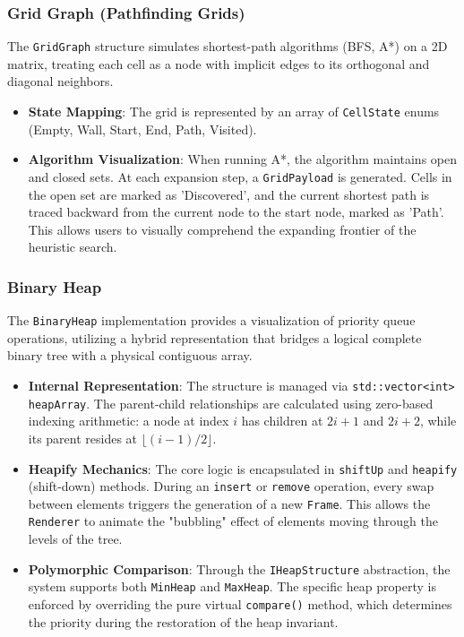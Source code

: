 \subsubsection{Grid Graph (Pathfinding Grids)}
The \texttt{GridGraph} structure simulates shortest-path algorithms (BFS, A*) on a 2D matrix, treating each cell as a node with implicit edges to its orthogonal and diagonal neighbors.
\begin{itemize}
    \item \textbf{State Mapping}: The grid is represented by an array of \texttt{CellState} enums (Empty, Wall, Start, End, Path, Visited).
    \item \textbf{Algorithm Visualization}: When running A*, the algorithm maintains open and closed sets. At each expansion step, a \texttt{GridPayload} is generated. Cells in the open set are marked as 'Discovered', and the current shortest path is traced backward from the current node to the start node, marked as 'Path'. This allows users to visually comprehend the expanding frontier of the heuristic search.
\end{itemize}

\subsubsection{Binary Heap}
The \texttt{BinaryHeap} implementation provides a visualization of priority queue operations, utilizing a hybrid representation that bridges a logical complete binary tree with a physical contiguous array.

\begin{itemize}
    \item \textbf{Internal Representation}: The structure is managed via \texttt{std::vector<int> heapArray}. The parent-child relationships are calculated using zero-based indexing arithmetic: a node at index $i$ has children at $2i+1$ and $2i+2$, while its parent resides at $\lfloor(i-1)/2\rfloor$.
    \item \textbf{Heapify Mechanics}: The core logic is encapsulated in \texttt{shiftUp} and \texttt{heapify} (shift-down) methods. During an \texttt{insert} or \texttt{remove} operation, every swap between elements triggers the generation of a new \texttt{Frame}. This allows the \texttt{Renderer} to animate the "bubbling" effect of elements moving through the levels of the tree.
    \item \textbf{Polymorphic Comparison}: Through the \texttt{IHeapStructure} abstraction, the system supports both \texttt{MinHeap} and \texttt{MaxHeap}. The specific heap property is enforced by overriding the pure virtual \texttt{compare()} method, which determines the priority during the restoration of the heap invariant.
\end{itemize}

